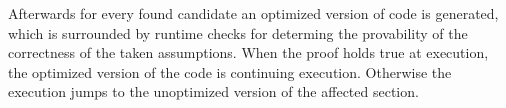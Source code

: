 Afterwards for every found candidate an optimized version of code is generated, which is surrounded by runtime checks for determing the provability of the correctness of the taken assumptions.
When the proof holds true at execution, the optimized version of the code is continuing execution.
Otherwise the execution jumps to the unoptimized version of the affected section.
